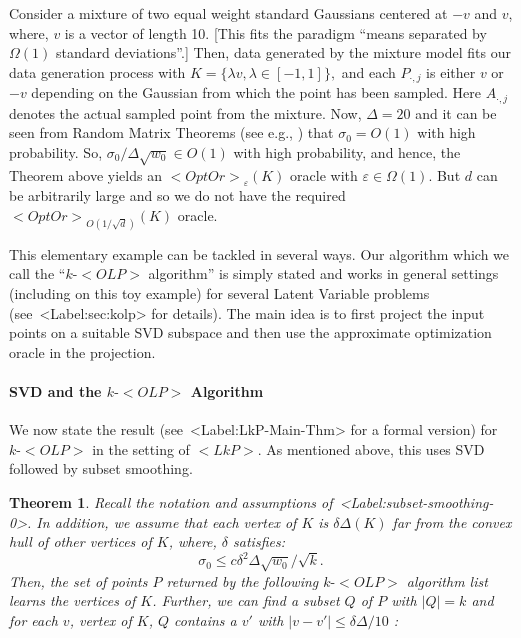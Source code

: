 \documentclass[11pt,letterpaper]{article}
\newcounter{note}[section]
\def\mathsf#1{<#1>}%
\def\xspace{}%
\def\Cref#1{<Label:#1>}%
\newtheorem{theorem}{Theorem}[section]
\theoremstyle{definition}
\theoremstyle{remark}
\newcommand{\lkp}{{\mathsf {LkP}}\xspace}
\newcommand{\olp}{{\mathsf {OLP}}\xspace}
\newcommand{\kolp}{k\mbox{-}\olp}
\newcommand{\Pdot}[1]{{P_{\cdot, #1}}}
\newcommand{\Adot}[1]{{A_{\cdot, #1}}}
\newcommand{\opto}{{\mathsf{OptOr}}}
\begin{document}
Consider a mixture of two equal weight standard Gaussians centered at $-v$ and $v$, where, $v$ is a vector of length 10. [This fits the paradigm ``means separated by $\Omega(1)$ standard deviations''.] Then, data generated by the mixture model fits our data generation process with $K=\{ \lambda v, \lambda\in [-1,1]\},$ and each $\Pdot{j}$ is either $v$ or $-v$ depending on the Gaussian from which the point has been sampled. Here $\Adot{j}$ denotes the actual sampled point from the mixture. 
Now, $\Delta =20$ and it can be seen from Random Matrix Theorems (see e.g., \cite{vers}) that $\sigma_0=O(1)$ with high probability. 
So, $\sigma_0/\Delta\sqrt{w_0}\in O(1)$ with high probability, and hence, the Theorem above 
yields an $\opto_\varepsilon(K)$ oracle with $\varepsilon\in\Omega(1)$. But
$d$ can be arbitrarily large and so we do not have the required $\opto_{O(1/\sqrt d)}(K)$  oracle. 

This elementary example can be tackled in several ways. Our algorithm which we call the ``$\kolp$ algorithm'' is simply stated and works in general settings (including on this toy example) for several Latent Variable problems (see~\Cref{sec:kolp} for details). The main idea is to first project the input points on a suitable SVD subspace and then use the approximate optimization oracle in the projection.

\paragraph{SVD and the $\kolp$ Algorithm}

We now state the result (see~\Cref{LkP-Main-Thm} for a formal version) for $\kolp$ in the setting of $\lkp$. As mentioned above, this uses SVD followed by subset smoothing. 

\begin{theorem}\label{kolp-thm}
Recall the notation and assumptions of~\Cref{subset-smoothing-0}. In addition, we assume that each vertex of $K$ is $\delta\Delta(K)$ far from the convex hull of other vertices of $K$, where, $\delta$ satisfies:
$$\sigma_0\leq c\delta^2\Delta\sqrt {w_0}/\sqrt k.$$
Then, the set of points $P$ returned by the following $\kolp$ algorithm list learns the vertices of $K$. 
Further, we can find a subset $Q$ of $P$ with $|Q|=k$ and for each $v$, vertex of $K$, $Q$ contains a $v'$ with $|v-v'|\leq \delta\Delta /10$ :
\end{theorem}
\end{document}
